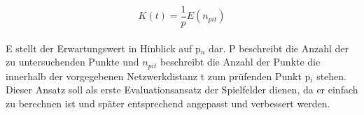 \begin{equation}
K(t) = \frac{1}{p}E(n_{pit})
\end{equation}
\\
E stellt der Erwartungswert in Hinblick auf p$_n$ dar. P beschreibt die Anzahl der zu untersuchenden Punkte und $n_{pit}$ beschreibt die Anzahl der Punkte die innerhalb der vorgegebenen Netzwerkdistanz t zum prüfenden Punkt p$_i$ stehen.
Dieser Ansatz soll als erste Evaluationsansatz der Spielfelder dienen, da er einfach zu berechnen ist und später entsprechend angepasst und verbessert werden.


